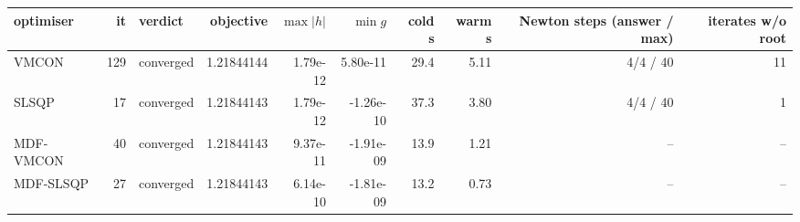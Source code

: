 \begin{tabular}{lrlrrrrrrr}
\toprule
optimiser & it & verdict & objective & $\max|h|$ & $\min g$ & cold s & warm s & Newton steps (answer / max) & iterates w/o root \\
\midrule
VMCON & 129 & converged & 1.21844144 & 1.79e-12 & 5.80e-11 & 29.4 & 5.11 & 4/4 / 40 & 11 \\
SLSQP & 17 & converged & 1.21844143 & 1.79e-12 & -1.26e-10 & 37.3 & 3.80 & 4/4 / 40 & 1 \\
MDF-VMCON & 40 & converged & 1.21844143 & 9.37e-11 & -1.91e-09 & 13.9 & 1.21 & -- & -- \\
MDF-SLSQP & 27 & converged & 1.21844143 & 6.14e-10 & -1.81e-09 & 13.2 & 0.73 & -- & -- \\
\bottomrule
\end{tabular}
